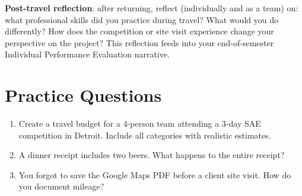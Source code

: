 \textbf{Post-travel reflection}: after returning, reflect (individually and as a team) on: what professional skills did you practice during travel? What would you do differently? How does the competition or site visit experience change your perspective on the project? This reflection feeds into your end-of-semester Individual Performance Evaluation narrative.


\section{Practice Questions}
\begin{enumerate}[leftmargin=1.5em]
\item Create a travel budget for a 4-person team attending a 3-day SAE competition in Detroit. Include all categories with realistic estimates.
\item A dinner receipt includes two beers. What happens to the entire receipt?
\item You forgot to save the Google Maps PDF before a client site visit. How do you document mileage?
\end{enumerate}



